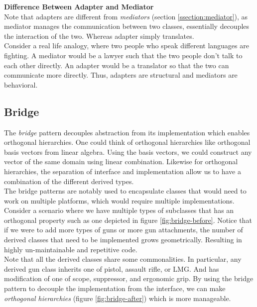 \begin{multicols}{2}
\textbf{Difference Between Adapter and Mediator}\bs
\\

Note that adapters are different from \textit{mediators} (section \ref{ssection:mediator}), as mediator manages the communication between two classes, essentially decouples the interaction of the two. Whereas adapter simply translates.\bs
\\
Consider a real life analogy, where two people who speak different languages are fighting. A mediator would be a lawyer such that the two people don't talk to each other directly. An adapter would be a translator so that the two can communicate more directly. Thus, adapters are structural and mediators are behavioral.

\subsection{Bridge}
The \textit{bridge} pattern decouples abstraction from its implementation which enables orthogonal hierarchies. One could think of orthogonal hierarchies like orthogonal basis vectors from linear algebra. Using the basis vectors, we could construct any vector of the same domain using linear combination. Likewise for orthogonal hierarchies, the separation of interface and implementation allow us to have a combination of the different derived types.\bs
\\
The bridge patterns are notably used to encapsulate classes that would need to work on multiple platforms, which would require multiple implementations.\bs
\\
Consider a scenario where we have multiple types of subclasses that has an orthogonal property such as one depicted in figure \ref{fig:bridge-before}. Notice that if we were to add more types of guns or more gun attachments, the number of derived classes that need to be implemented grows geometrically. Resulting in highly un-maintainable and repetitive code.\bs
\\
Note that all the derived classes share some commonalities. In particular, any derived gun class inherits one of pistol, assault rifle, or LMG. And has modification of one of scope, suppressor, and ergonomic grip. By using the bridge pattern to decouple the implementation from the interface, we can make \textit{orthogonal hierarchies} (figure \ref{fig:bridge-after}) which is more manageable.\bs
\\

\iftwocolumns
\end{multicols}
\fi

